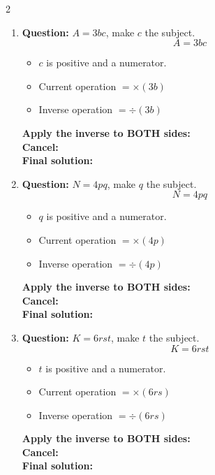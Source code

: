 \documentclass[11pt]{article}
\begin{document}
\begin{multicols}{2}
\begin{enumerate}[leftmargin=*, itemsep=10pt]
\newpage
\item \textbf{Question:} \( A = 3bc \), make \( c \) the subject.
\[
A=3bc
\]
\begin{itemize}[leftmargin=*, itemsep=2pt]
\item \(c\) is positive and a numerator.
\item Current operation \(= \times (3b)\)
\item Inverse operation \(= \div (3b)\)
\end{itemize}
\textbf{Apply the inverse to BOTH sides:} \\[1.5cm]
\textbf{Cancel:} \\[1.5cm]
\textbf{Final solution:}\\[1.5cm]

\item \textbf{Question:} \( N = 4pq \), make \( q \) the subject.
\[
N=4pq
\]
\begin{itemize}[leftmargin=*, itemsep=2pt]
\item \(q\) is positive and a numerator.
\item Current operation \(= \times (4p)\)
\item Inverse operation \(= \div (4p)\)
\end{itemize}
\textbf{Apply the inverse to BOTH sides:} \\[1.5cm]
\textbf{Cancel:} \\[1.5cm]
\textbf{Final solution:}\\[1.5cm]

\columnbreak
\item \textbf{Question:} \( K = 6rst \), make \( t \) the subject.
\[
K=6rst
\]
\begin{itemize}[leftmargin=*, itemsep=2pt]
\item \(t\) is positive and a numerator.
\item Current operation \(= \times (6rs)\)
\item Inverse operation \(= \div (6rs)\)
\end{itemize}
\textbf{Apply the inverse to BOTH sides:} \\[1.5cm]
\textbf{Cancel:} \\[1.5cm]
\textbf{Final solution:}\\[1.5cm]


\end{enumerate}
\end{multicols}
\end{document}
